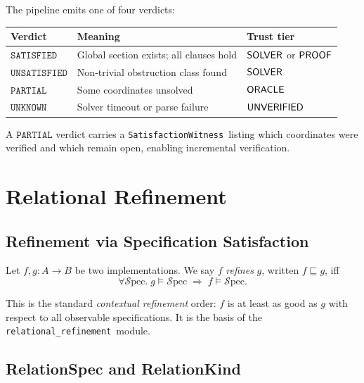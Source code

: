 \documentclass[11pt]{article}
\newcommand{\Spec}{\mathcal{S}\mathrm{pec}}        %
\newcommand{\Refine}{\sqsubseteq}                   %
\newcommand{\SAT}{\texttt{SATISFIED}}               %
\newcommand{\UNSAT}{\texttt{UNSATISFIED}}           %
\newcommand{\PARTIAL}{\texttt{PARTIAL}}             %
\newcommand{\UNKNOWN}{\texttt{UNKNOWN}}             %
\newcommand{\relpkg}{\texttt{relational\_refinement}}
\newcommand{\SatisfactionWitness}{\texttt{SatisfactionWitness}}
\begin{document}
The pipeline emits one of four verdicts:

\begin{center}
\begin{tabular}{lll}
\toprule
\textbf{Verdict} & \textbf{Meaning} & \textbf{Trust tier} \\
\midrule
$\SAT$ & Global section exists; all clauses hold & $\mathsf{SOLVER}$ or $\mathsf{PROOF}$ \\
$\UNSAT$ & Non-trivial obstruction class found & $\mathsf{SOLVER}$ \\
$\PARTIAL$ & Some coordinates unsolved & $\mathsf{ORACLE}$ \\
$\UNKNOWN$ & Solver timeout or parse failure & $\mathsf{UNVERIFIED}$ \\
\bottomrule
\end{tabular}
\end{center}

A $\PARTIAL$ verdict carries a \SatisfactionWitness\ listing which
coordinates were verified and which remain open, enabling incremental
verification.

\section{Relational Refinement}\label{sec:refinement}

\subsection{Refinement via Specification Satisfaction}\label{sec:refine-def}

\begin{definition}\label{def:refinement}
Let $f, g : A \to B$ be two implementations.  We say $f$
\emph{refines} $g$, written $f \Refine g$, iff
\[
  \forall \Spec.\; g \models \Spec \;\Rightarrow\; f \models \Spec.
\]
\end{definition}

This is the standard \emph{contextual refinement} order: $f$ is at
least as good as $g$ with respect to all observable specifications.
It is the basis of the \relpkg\ module.

\subsection{RelationSpec and RelationKind}\label{sec:relationspec}
\end{document}
